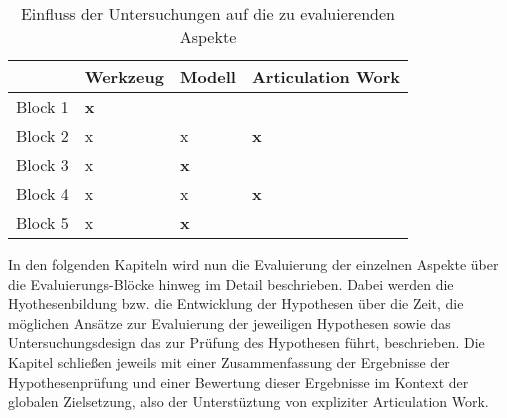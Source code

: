 \begin{table}[htbp]
	\centering
	\caption{Einfluss der Untersuchungen auf die zu evaluierenden Aspekte}
	\begin{tabular}{| p{3cm} || p{2cm} | p{2cm} | p{2cm} |} \hline
		 & Werkzeug & Modell & Articulation Work \\ \hline \hline
		 Block 1 & \textbf{x} &  &   \\ \hline
		 Block 2 & x & x & \textbf{x}  \\ \hline
		 Block 3 & x & \textbf{x} &   \\ \hline
		 Block 4 & x & x & \textbf{x}  \\ \hline
		 Block 5 & x & \textbf{x} &   \\ \hline
	\end{tabular}
	\label{tab:evaluierungsMatrix}
\end{table}

In den folgenden Kapiteln wird nun die Evaluierung der einzelnen Aspekte über die Evaluierungs-Blöcke hinweg im Detail beschrieben. Dabei werden die Hyothesenbildung bzw. die Entwicklung der Hypothesen über die Zeit, die möglichen Ansätze zur Evaluierung der jeweiligen Hypothesen sowie das Untersuchungsdesign das zur Prüfung des Hypothesen führt, beschrieben. Die Kapitel schließen jeweils mit einer Zusammenfassung der Ergebnisse der Hypothesenprüfung und einer Bewertung dieser Ergebnisse im Kontext der globalen Zielsetzung, also der Unterstüztung von expliziter Articulation Work.

